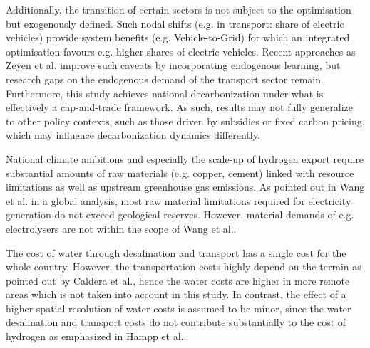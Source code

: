 Additionally, the transition of certain sectors is not subject to the optimisation but exogenously defined. Such nodal shifts (e.g. in transport: share of electric vehicles) provide system benefits (e.g. Vehicle-to-Grid) for which an integrated optimisation favours e.g. higher shares of electric vehicles.
Recent approaches as Zeyen et al.\cite{Zeyen2023} improve such caveats by incorporating endogenous learning, but research gaps on the endogenous demand of the transport sector remain.
Furthermore, this study achieves national decarbonization under what is effectively a cap-and-trade framework. As such, results may not fully generalize to other policy contexts, such as those driven by subsidies or fixed carbon pricing, which may influence decarbonization dynamics differently.

National climate ambitions and especially the scale-up of hydrogen export require substantial amounts of raw materials (e.g. copper, cement) linked with resource limitations as well as upstream greenhouse gas emissions. As pointed out in Wang et al.\cite{Wang2023} in a global analysis, most raw material limitations required for electricity generation do not exceed geological reserves. However, material demands of e.g. electrolysers are not within the scope of Wang et al.\cite{Wang2023}.

The cost of water through desalination and transport has a single cost for the whole country. However, the transportation costs highly depend on the terrain as pointed out by Caldera et al.\cite{Caldera2016}, hence the water costs are higher in more remote areas which is not taken into account in this study. In contrast, the effect of a higher spatial resolution of water costs is assumed to be minor, since the water desalination and transport costs do not contribute substantially to the cost of hydrogen as emphasized in Hampp et al.\cite{Hampp2023}.

